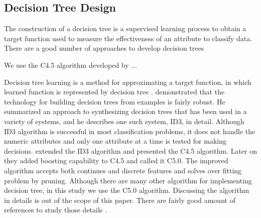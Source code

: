 
\subsection{Decision Tree Design}
\label{sec:decision-tree}

The construction of a decision tree is a supervised learning process to obtain a target function used to measure the effectiveness of an attribute to classify data. There are a good number of approaches to develop decision trees \citep[e.g.,][]{Quinlan_1986_ML, Mitchell_1997_Book, Hornik_2009_}

We use the C4.5 algorithm developed by \citet{Quinlan_1993_Book}...


%
% 
Decision tree learning is a method for approximating a target function, in which learned function is represented by decision tree \citep{Mitchell_1997_Book}. \citet{Quinlan_1986} demonstrated that the technology for building decision trees from examples is fairly robust. He summarized an approach to synthesizing decision trees that has been used in a variety of systems, and he describes one such system, ID3, in detail. Although ID3 algorithm is successful in most classification problems, it does not handle the numeric attributes and only one attribute at a time is tested for making decisions. \citet{Quinlan_1993_Book} extended the ID3 algorithm and presented the C4.5 algorithm. Later on they added boosting capability to C4.5 and called it C5.0. The improved algorithm accepts both continues and discrete features and solves over fitting problem by pruning. Although there are many other algorithm for implementing decision tree, in this study we use the C5.0 algorithm. Discussing the algorithm in details is out of the scope of this paper. There are fairly good amount of references to study those details \citep[e.g.,][]{Mitchell_1997_Book, Quinlan_1993_Book, Hornik_2009_}.

